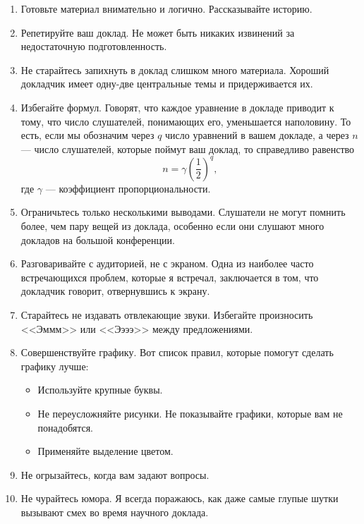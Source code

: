 \documentclass[12pt]{article}
\begin{document}
\begin{enumerate}
\item Готовьте материал внимательно и логично. Рассказывайте историю.
\item Репетируйте ваш доклад. Не может быть никаких извинений за недостаточную подготовленность.
\item Не старайтесь запихнуть в доклад слишком много материала. Хороший докладчик имеет одну-две центральные темы и придерживается
их.
\item Избегайте формул. Говорят, что каждое уравнение в докладе приводит к тому, что число слушателей, понимающих его, уменьшается
наполовину. То есть, если мы обозначим через $q$ число уравнений в вашем докладе, а через $n$ --- число слушателей, которые поймут ваш
доклад, то справедливо равенство
\begin{equation*}
  n = \gamma\left(\frac{1}{2}\right)^q,
\end{equation*}
где $\gamma$ --- коэффициент пропорциональности.
\item Ограничьтесь только несколькими выводами. Слушатели не могут помнить более, чем пару вещей из доклада, особенно если они
слушают много докладов на большой конференции.
\item Разговаривайте с аудиторией, не с экраном. Одна из наиболее часто встречающихся проблем, которые я встречал, заключается в
том, что докладчик говорит, отвернувшись к экрану.
\item Старайтесь не издавать отвлекающие звуки. Избегайте произносить <<Эммм>> или <<Ээээ>> между предложениями.
\item Совершенствуйте графику. Вот список правил, которые помогут сделать графику лучше:
\begin{itemize}
  \item Используйте крупные буквы.
  \item Не переусложняйте рисунки. Не показывайте графики, которые вам не понадобятся.
  \item Применяйте выделение цветом.
\end{itemize}
\item Не огрызайтесь, когда вам задают вопросы.
\item Не чурайтесь юмора. Я всегда поражаюсь, как даже самые глупые шутки вызывают смех во время научного доклада.
\end{enumerate}
\end{document}
